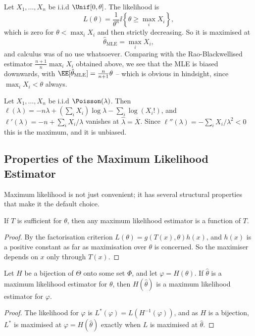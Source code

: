 \begin{example}
  Let $X_1, \dots, X_n$ be i.i.d $\Unif[0,\theta]$. The likelihood is
  $$
  L(\theta) = \frac{1}{\theta^n}\ii\left\{\theta \geq \max_i X_i\right\},
  $$
  which is zero for $\theta < \max_i X_i$ and then strictly decreasing. So it is maximised at
  $$
  \hat\theta_{\mathrm{MLE}} = \max_i X_i,
  $$
  and calculus was of no use whatsoever. Comparing with the Rao-Blackwellised estimator $\frac{n+1}{n}\max_i X_i$ obtained above, we see that the MLE is biased downwards, with $\EE[\hat\theta_{\mathrm{MLE}}] = \frac{n}{n+1}\theta$ -- which is obvious in hindsight, since $\max_i X_i < \theta$ always.
\end{example}

\begin{example}[Poisson]
  Let $X_1, \dots, X_n$ be i.i.d $\Poisson(\lambda)$. Then $\ell(\lambda) = -n\lambda + \left(\sum_i X_i\right)\log\lambda - \sum_i \log(X_i!)$, and $\ell'(\lambda) = -n + \sum_i X_i/\lambda$ vanishes at $\hat\lambda = \overline{X}$. Since $\ell''(\lambda) = -\sum_i X_i/\lambda^2 < 0$ this is the maximum, and it is unbiased.
\end{example}

\subsection{Properties of the Maximum Likelihood Estimator}

Maximum likelihood is not just convenient; it has several structural properties that make it the default choice.

\begin{proposition}
  If $T$ is sufficient for $\theta$, then any maximum likelihood estimator is a function of $T$.
\end{proposition}
\begin{proof}
  By the factorisation criterion $L(\theta) = g(T(x),\theta)h(x)$, and $h(x)$ is a positive constant as far as maximisation over $\theta$ is concerned. So the maximiser depends on $x$ only through $T(x)$.
\end{proof}

\begin{proposition}[Invariance]
  Let $H$ be a bijection of $\Theta$ onto some set $\Phi$, and let $\varphi = H(\theta)$. If $\hat\theta$ is a maximum likelihood estimator for $\theta$, then $H(\hat\theta)$ is a maximum likelihood estimator for $\varphi$.
\end{proposition}
\begin{proof}
  The likelihood for $\varphi$ is $L^*(\varphi) = L(H^{-1}(\varphi))$, and as $H$ is a bijection, $L^*$ is maximised at $\varphi = H(\hat\theta)$ exactly when $L$ is maximised at $\hat\theta$.
\end{proof}

